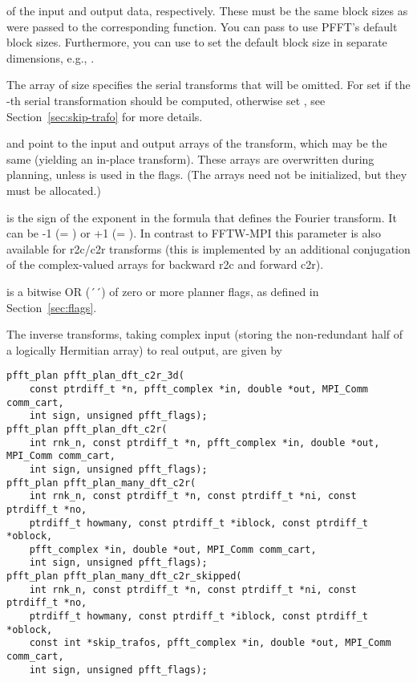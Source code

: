 \begin{compactitem}
        of the input and output data, respectively. These must be the same block sizes as were passed to the corresponding  function.
        You can pass  to use PFFT's default block sizes. Furthermore, you can use  to set
        the default block size in separate dimensions, e.g., .
  \item The array  of size  specifies the serial transforms that will be omitted.
        For  set  if the -th serial transformation should be computed,
        otherwise set , see Section~\ref{sec:skip-trafo} for more details.
  \item {} and  point to the input and output arrays of the transform, which may be the same (yielding an in-place transform).
        These arrays are overwritten during planning, unless  is used in the flags.
        (The arrays need not be initialized, but they must be allocated.)
  \item {} is the sign of the exponent in the formula that defines the Fourier transform. It can be -1 (= ) or +1 (= ).
        In contrast to FFTW-MPI this parameter is also available for r2c/c2r transforms (this is implemented by an additional conjugation of the complex-valued arrays
        for backward r2c and forward c2r).
  \item {} is a bitwise OR (´\code{|}´) of zero or more planner flags, as defined in Section~\ref{sec:flags}.
\end{compactitem}

The inverse transforms, taking complex input (storing the non-redundant half of a logically Hermitian array) to real output, are given by
\begin{lstlisting}
pfft_plan pfft_plan_dft_c2r_3d(
    const ptrdiff_t *n, pfft_complex *in, double *out, MPI_Comm comm_cart,
    int sign, unsigned pfft_flags);
pfft_plan pfft_plan_dft_c2r(
    int rnk_n, const ptrdiff_t *n, pfft_complex *in, double *out, MPI_Comm comm_cart,
    int sign, unsigned pfft_flags);
pfft_plan pfft_plan_many_dft_c2r(
    int rnk_n, const ptrdiff_t *n, const ptrdiff_t *ni, const ptrdiff_t *no,
    ptrdiff_t howmany, const ptrdiff_t *iblock, const ptrdiff_t *oblock,
    pfft_complex *in, double *out, MPI_Comm comm_cart,
    int sign, unsigned pfft_flags);
pfft_plan pfft_plan_many_dft_c2r_skipped(
    int rnk_n, const ptrdiff_t *n, const ptrdiff_t *ni, const ptrdiff_t *no,
    ptrdiff_t howmany, const ptrdiff_t *iblock, const ptrdiff_t *oblock,
    const int *skip_trafos, pfft_complex *in, double *out, MPI_Comm comm_cart,
    int sign, unsigned pfft_flags);
\end{lstlisting}


